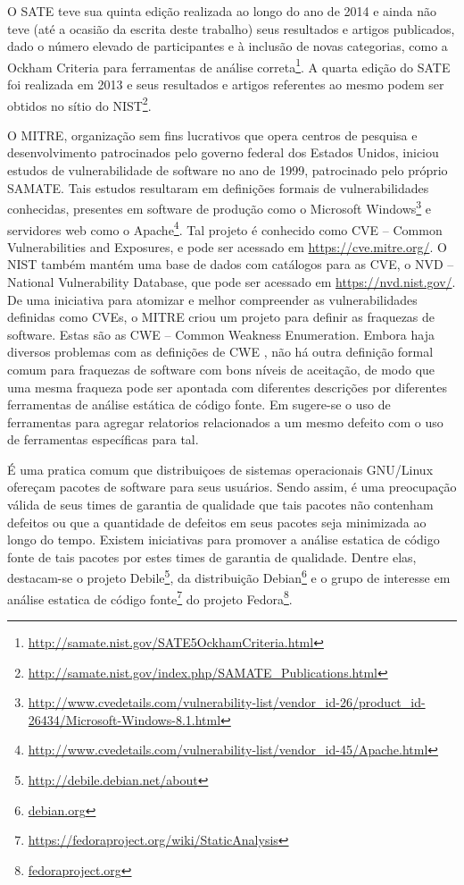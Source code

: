   O SATE teve sua quinta edição realizada ao longo do ano de 2014 e ainda não teve (até a ocasião da escrita deste trabalho) seus resultados e artigos publicados, dado o número elevado de participantes e à inclusão de novas categorias, como a Ockham Criteria para ferramentas de análise correta\footnote{\url{http://samate.nist.gov/SATE5OckhamCriteria.html}}. A quarta edição do SATE foi realizada em 2013 e seus resultados e artigos referentes ao mesmo podem ser obtidos no sítio do NIST\footnote{\url{http://samate.nist.gov/index.php/SAMATE_Publications.html}}.


  O MITRE, organização sem fins lucrativos que opera centros de pesquisa e desenvolvimento patrocinados pelo governo federal dos Estados Unidos, iniciou estudos de vulnerabilidade de software no ano de 1999, patrocinado pelo próprio SAMATE. Tais estudos resultaram em definições formais de vulnerabilidades conhecidas, presentes em software de produção como o Microsoft Windows\footnote{\url{http://www.cvedetails.com/vulnerability-list/vendor_id-26/product_id-26434/Microsoft-Windows-8.1.html}} e servidores web como o Apache\footnote{\url{http://www.cvedetails.com/vulnerability-list/vendor_id-45/Apache.html}}. Tal projeto é conhecido como CVE – Common Vulnerabilities and Exposures, e pode ser acessado em \url{https://cve.mitre.org/}. O NIST também mantém uma base de dados com catálogos para as CVE, o NVD – National Vulnerability Database, que pode ser acessado em \url{https://nvd.nist.gov/}. De uma iniciativa para atomizar e melhor compreender as vulnerabilidades definidas como CVEs, o MITRE criou um projeto para definir as fraquezas de software. Estas são as CWE – Common Weakness Enumeration. Embora haja diversos problemas com as definições de CWE \cite{yan}, não há outra definição formal comum para fraquezas de software com bons níveis de aceitação, de modo que uma mesma fraqueza pode ser apontada com diferentes descrições por diferentes ferramentas de análise estática de código fonte. Em \cite{clustering} sugere-se o uso de ferramentas para agregar relatorios relacionados a um mesmo defeito com o uso de ferramentas específicas para tal.

  É uma pratica comum que distribuiçoes de sistemas operacionais GNU/Linux ofereçam pacotes de software para seus usuários. Sendo assim, é uma preocupação válida de seus times de garantia de qualidade que tais pacotes não contenham defeitos ou que a quantidade de defeitos em seus pacotes seja minimizada ao longo do tempo. Existem iniciativas para promover a análise estatica de código fonte de tais pacotes por estes times de garantia de qualidade. Dentre elas, destacam-se o projeto Debile\footnote{\url{http://debile.debian.net/about}}, da distribuição Debian\footnote{\url{debian.org}} e o grupo de interesse em análise estatica de código fonte\footnote{\url{https://fedoraproject.org/wiki/StaticAnalysis}} do projeto Fedora\footnote{\url{fedoraproject.org}}.


